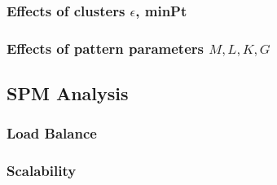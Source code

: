 \subsubsection{Effects of clusters $\epsilon$, minPt}
\subsubsection{Effects of pattern parameters $M,L,K,G$}


\subsection{SPM Analysis}
\subsubsection{Load Balance}
\subsubsection{Scalability}



